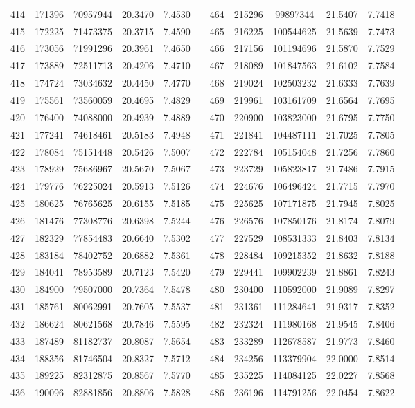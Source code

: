 \begin{longtable}{SSSSSSSSSSSS}
414&171396&70957944&20.3470&7.4530&&464&215296&99897344&21.5407&7.7418\\
415&172225&71473375&20.3715&7.4590&&465&216225&100544625&21.5639&7.7473\\
416&173056&71991296&20.3961&7.4650&&466&217156&101194696&21.5870&7.7529\\
417&173889&72511713&20.4206&7.4710&&467&218089&101847563&21.6102&7.7584\\
418&174724&73034632&20.4450&7.4770&&468&219024&102503232&21.6333&7.7639\\
419&175561&73560059&20.4695&7.4829&&469&219961&103161709&21.6564&7.7695\\
420&176400&74088000&20.4939&7.4889&&470&220900&103823000&21.6795&7.7750\\
421&177241&74618461&20.5183&7.4948&&471&221841&104487111&21.7025&7.7805\\
422&178084&75151448&20.5426&7.5007&&472&222784&105154048&21.7256&7.7860\\
423&178929&75686967&20.5670&7.5067&&473&223729&105823817&21.7486&7.7915\\
424&179776&76225024&20.5913&7.5126&&474&224676&106496424&21.7715&7.7970\\
425&180625&76765625&20.6155&7.5185&&475&225625&107171875&21.7945&7.8025\\
426&181476&77308776&20.6398&7.5244&&476&226576&107850176&21.8174&7.8079\\
427&182329&77854483&20.6640&7.5302&&477&227529&108531333&21.8403&7.8134\\
428&183184&78402752&20.6882&7.5361&&478&228484&109215352&21.8632&7.8188\\
429&184041&78953589&20.7123&7.5420&&479&229441&109902239&21.8861&7.8243\\
430&184900&79507000&20.7364&7.5478&&480&230400&110592000&21.9089&7.8297\\
431&185761&80062991&20.7605&7.5537&&481&231361&111284641&21.9317&7.8352\\
432&186624&80621568&20.7846&7.5595&&482&232324&111980168&21.9545&7.8406\\
433&187489&81182737&20.8087&7.5654&&483&233289&112678587&21.9773&7.8460\\
434&188356&81746504&20.8327&7.5712&&484&234256&113379904&22.0000&7.8514\\
435&189225&82312875&20.8567&7.5770&&485&235225&114084125&22.0227&7.8568\\
436&190096&82881856&20.8806&7.5828&&486&236196&114791256&22.0454&7.8622\\

\end{longtable}
